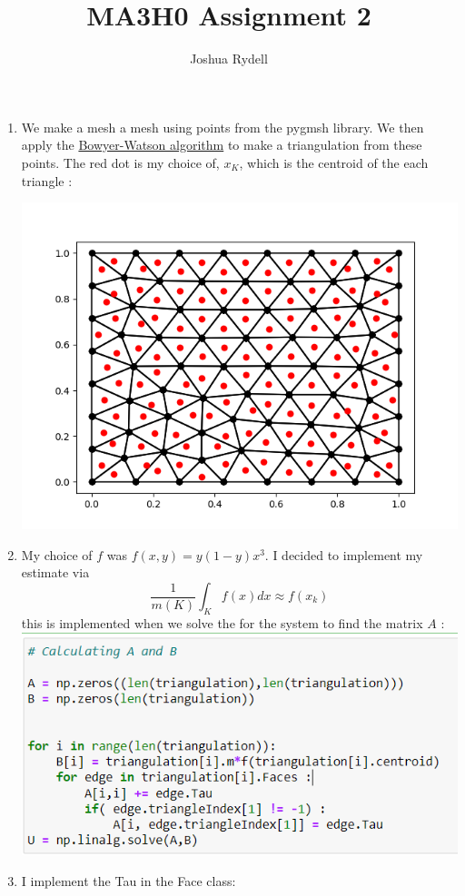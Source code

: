 \documentclass[a4paper,11pt]{article}
\title{MA3H0 Assignment 2}
\author{Joshua Rydell}
\theoremstyle{plain} %
\theoremstyle{definition} %
\theoremstyle{remark} %
\begin{document}
  
\maketitle
\begin{enumerate}
\item We make a mesh a mesh using points from the pygmsh library. We then apply the 
\href{'https://en.wikipedia.org/wiki/Bowyer\%E2\%80\%93Watson_algorithm#:~:text=In\%20computational\%20geometry\%2C\%20the\%20Bowyer,graph\%20of\%20the\%20Delaunay\%20triangulation.}{Bowyer-Watson algorithm} to make a triangulation from these points. The red dot is my choice of, $x_K$, which is the centroid of the each triangle :  

\includegraphics[scale = 0.9]{mesh.png}

\item My choice of $f$ was $f(x,y) = y(1-y)x^3$. I decided to implement my estimate via
\[\frac{1}{m(K)} \int_K f(x) dx \approx f(x_k) \]
this is implemented when we solve the for the system to find the matrix $A$ :
\includegraphics[scale=0.9]{fk.png}
\item I implement the Tau in the Face class:



\end{enumerate}
\end{document}
